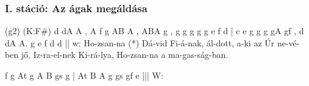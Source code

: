 \documentclass[twoside]{article}
\begin{document}
\subsubsection*{I. stáció: Az ágak megáldása}




\begin{aretino}
(g2) (K:F#) d dA A , A f g AB A , ABA g , g g g g g e f d |
c e g g g gA gf , d dA A. g e f d d ||
w: Ho-zsan-na (*) Dá-vid Fi-á-nak, ál-dott, a-ki az Úr ne-vé-ben jő,
Iz-ra-el-nek Ki-rá-lya, Ho-zsan-na a ma-gas-ság-ban.

f g At g A B gs g | At B A g gs gf e |||
W: 
\end{aretino}
\end{document}
